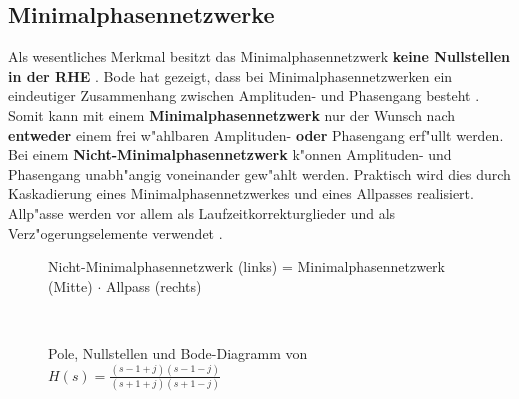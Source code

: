 {\subsection{Minimalphasennetzwerke}  
Als
wesentliches Merkmal besitzt das Minimalphasennetzwerk {\bf keine
Nullstellen in der RHE} \cite{KIE:JAE:05}. Bode hat gezeigt, dass bei
  Minimalphasennetzwerken ein eindeutiger Zusammenhang zwischen
  Amplituden- und Phasengang besteht \cite{MOS:89}. Somit kann mit einem
  {\bf Minimalphasennetzwerk} nur der Wunsch nach {\bf entweder} einem frei w"ahlbaren
  Amplituden- {\bf oder} Phasengang erf"ullt werden.\\  Bei einem
{\bf Nicht-Minimalphasennetzwerk} k"onnen Amplituden- und Phasengang
unabh"angig voneinander gew"ahlt werden. Praktisch wird dies durch
Kaskadierung eines Minimalphasennetzwerkes und eines Allpasses
realisiert.  Allp"asse werden vor allem als
Laufzeitkorrekturglieder und als
Verz"ogerungselemente
verwendet \cite{MOS:89}.
\begin{figure}[!htb]\vspace*{-3mm}
\begin{center} %
\hspace*{-1.5cm}\hspace*{-0.5cm}\hspace*{-0.5cm}\vspace*{-9mm}\caption{Nicht-Minimalphasennetzwerk (links) = Minimalphasennetzwerk (Mitte) $\cdot$ Allpass (rechts)}
\end{center}
\vspace*{-6mm}
\end{figure}\\
\vspace*{-8mm}
\begin{figure}[!htb]\vspace*{-6mm}
\begin{center} %
\hspace*{-1.5cm}\hspace*{-1cm}\vspace*{-1mm}\caption{Pole, Nullstellen und Bode-Diagramm von  $H(s)=\frac{(s-1+j)(s-1-j)}{(s+1+j)(s+1-j)}$}
\end{center}
\vspace*{-6mm}
\end{figure}\\
\newpage
}
